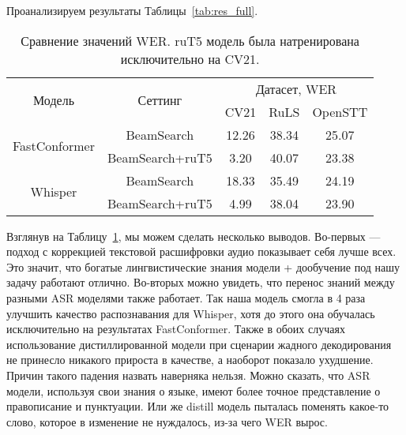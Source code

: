 Проанализируем результаты Таблицы~\ref{tab:res_full}.


\begin{table}[]
\centering
\caption{Сравнение значений WER. ruT5 модель была натренирована исключительно на CV21.}
\begin{tabular}{|c|c|ccc|}
\hline
\multirow{2}{*}{Модель}        & \multirow{2}{*}{Сеттинг}             & \multicolumn{3}{c|}{Датасет, WER}                                    \\ \cline{3-5} 
                               &                                      & \multicolumn{1}{c|}{CV21}  & \multicolumn{1}{c|}{RuLS}     & OpenSTT \\ \hline
\multirow{2}{*}{FastConformer} & BeamSearch                           & \multicolumn{1}{c|}{12.26} & \multicolumn{1}{c|}{38.34}    & 25.07   \\ \cline{2-5} 
                               & BeamSearch+ruT5                      & \multicolumn{1}{c|}{3.20}  & \multicolumn{1}{c|}{40.07}    & 23.38   \\ \hline
\multirow{2}{*}{Whisper}       & BeamSearch                           & \multicolumn{1}{c|}{18.33} & \multicolumn{1}{c|}{35.49}    & 24.19   \\ \cline{2-5} 
                               & BeamSearch+ruT5                      & \multicolumn{1}{c|}{4.99}  & \multicolumn{1}{c|}{38.04}    & 23.90       \\ \hline
\end{tabular}
\label{tab:res_cv_trained}
\end{table}

Взглянув на Таблицу~\ref{tab:res_cv_trained}, мы можем сделать несколько выводов.
Во-первых — подход с коррекцией текстовой расшифровки аудио показывает себя лучше всех.
Это значит, что богатые лингвистические знания модели + дообучение под нашу задачу работают отлично.
Во-вторых можно увидеть, что перенос знаний между разными ASR моделями также работает.
Так наша модель смогла в 4 раза улучшить качество распознавания для Whisper, хотя до этого она обучалась исключительно на результатах FastConformer.
Также в обоих случаях использование дистиллированной модели при сценарии жадного декодирования не принесло никакого прироста в качестве, а наоборот показало ухудшение. Причин такого падения назвать наверняка нельзя.
Можно сказать, что ASR модели, используя свои знания о языке, имеют более точное представление о правописание и пунктуации.
Или же distill модель пыталась поменять какое-то слово, которое в изменение не нуждалось, из-за чего WER вырос.

